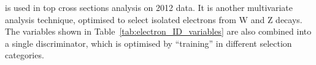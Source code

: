 \begin{description}[wide=\parindent]



 \item[MVA ID] is used in top cross sections analysis on 2012 data. It is another multivariate analysis technique,
optimised to select isolated electrons from W and Z decays. The variables shown in Table~\ref{tab:electron_ID_variables}
are also combined into a single discriminator, which is optimised by ``training'' in different selection categories.


\end{description}
